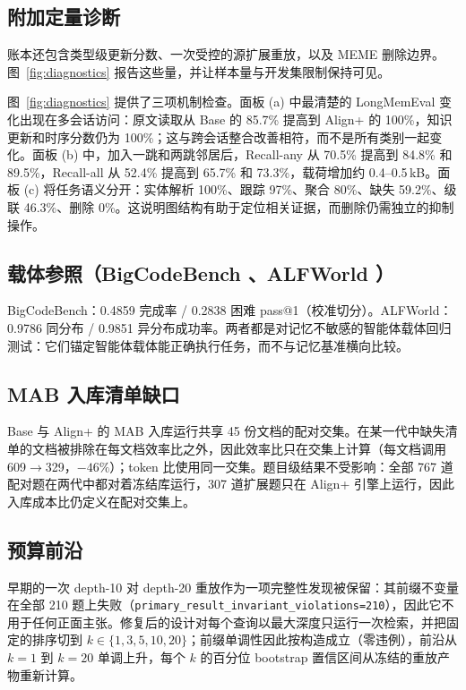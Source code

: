 \subsection{附加定量诊断}
\label{app:additional-diagnostics}

账本还包含类型级更新分数、一次受控的源扩展重放，以及 MEME 删除边界。图~\ref{fig:diagnostics} 报告这些量，并让样本量与开发集限制保持可见。

\clearpage


图~\ref{fig:diagnostics} 提供了三项机制检查。面板 (a) 中最清楚的 LongMemEval 变化出现在多会话访问：原文读取从 Base 的 85.7\% 提高到 Align+ 的 100\%，知识更新和时序分数仍为 100\%；这与跨会话整合改善相符，而不是所有类别一起变化。面板 (b) 中，加入一跳和两跳邻居后，Recall-any 从 70.5\% 提高到 84.8\% 和 89.5\%，Recall-all 从 52.4\% 提高到 65.7\% 和 73.3\%，载荷增加约 0.4--0.5\,kB。面板 (c) 将任务语义分开：实体解析 100\%、跟踪 97\%、聚合 80\%、缺失 59.2\%、级联 46.3\%、删除 0\%。这说明图结构有助于定位相关证据，而删除仍需独立的抑制操作。

\subsection{载体参照（BigCodeBench \citep{zhuo2024bigcodebench}、ALFWorld \citep{shridhar2021alfworld}）}
\label{app:carrier-anchors}

BigCodeBench：0.4859 完成率 / 0.2838 困难 pass@1（校准切分）。ALFWorld：0.9786 同分布 / 0.9851 异分布成功率。两者都是对记忆不敏感的智能体载体回归测试：它们锚定智能体载体能正确执行任务，而不与记忆基准横向比较。

\subsection{MAB 入库清单缺口}
\label{app:manifest-gaps}

Base 与 Align+ 的 MAB 入库运行共享 45 份文档的配对交集。在某一代中缺失清单的文档被排除在每文档效率比之外，因此效率比只在交集上计算（每文档调用 609$\to$329，$-46\%$）；token 比使用同一交集。题目级结果不受影响：全部 767 道配对题在两代中都对着冻结库运行，307 道扩展题只在 Align+ 引擎上运行，因此入库成本比仍定义在配对交集上。

\subsection{预算前沿}
\label{app:budget}

早期的一次 depth-10 对 depth-20 重放作为一项完整性发现被保留：其前缀不变量在全部 210 题上失败（\texttt{primary\_result\_invariant\_violations=210}），因此它不用于任何正面主张。修复后的设计对每个查询以最大深度只运行一次检索，并把固定的排序切到 $k\in\{1,3,5,10,20\}$；前缀单调性因此按构造成立（零违例），前沿从 $k{=}1$ 到 $k{=}20$ 单调上升，每个 $k$ 的百分位 bootstrap 置信区间从冻结的重放产物重新计算。

